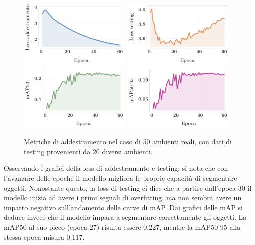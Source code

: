 \documentclass[12pt]{report}
\begin{document}
\begin{figure}[h!]
	\centering
	{\includegraphics[width=0.48\textwidth]{images/domain-shift/real-to-real/5/train-loss}}
	\hspace{0.01\textwidth}
	{\includegraphics[width=0.48\textwidth]{images/domain-shift/real-to-real/5/testing-loss}}
	\hspace{0.01\textwidth}
	\\
	{\includegraphics[width=0.48\textwidth]{images/domain-shift/real-to-real/5/map50}}
	\hspace{0.01\textwidth}
	{\includegraphics[width=0.48\textwidth]{images/domain-shift/real-to-real/5/map50-95}}
	\caption{Metriche di addestramento nel caso di 50 ambienti reali, con dati di testing provenienti da 20 diversi ambienti.}
	\label{fig:training-4}
\end{figure}

Osservando i grafici della loss di addestramento e testing, si nota che con l'avanzare delle epoche il modello migliora le proprie capacità di segmentare oggetti. Nonostante questo, la loss di testing ci dice che a partire dall'epoca 30 il modello inizia ad avere i primi segnali di overfitting, ma non sembra avere un impatto negativo sull'andamento delle curve di mAP. Dai grafici delle mAP si deduce invece che il modello impara a segmentare correttamente gli oggetti. La mAP50 al suo picco (epoca 27) risulta essere 0.227, mentre la mAP50-95 alla stessa epoca misura 0.117.
\end{document}
